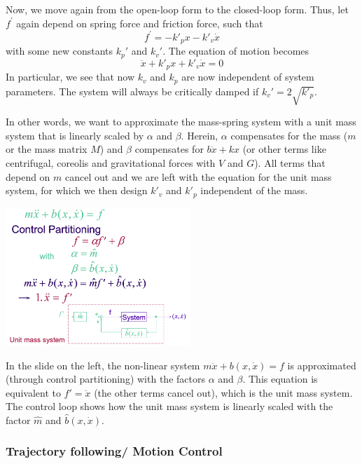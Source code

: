 Now, we move again from the open-loop form to the closed-loop form. Thus, let $f^{\prime}$ again depend on spring force and friction force, such that
$$
f^{\prime}=-k'_{p} x-k'_{v} \dot{x}
$$
with some new constants $k_{p}'$ and $k_{v}'$. The equation of motion becomes
$$
\ddot{x}+k'_{p} x+k'_{v} \dot{x}=0
$$
In particular, we see that now $k_{v}$ and $k_{p}$ are now independent of system parameters. The system will always be critically damped if $k_{v}'=2 \sqrt{k'_{p}}$.

In other words, we want to approximate the mass-spring system with a unit mass system that is linearly scaled by $\alpha$ and $\beta$. Herein, $\alpha$ compensates for the mass ($m$ or the mass matrix $M$) and $\beta$ compensates for $b\dot x+kx$ (or other terms like centrifugal, coreolis and gravitational forces with $V$ and $G$). All terms that depend on $m$ cancel out and we are left with the equation for the unit mass system, for which we then design $k'_{v}$ and $k'_{p}$ independent of the mass.
\\

\begin{minipage}[c]{0.45\textwidth}
	\includegraphics[width=7cm]{sections/imgs/7_control_partitioning.png}
\end{minipage}
\hfill
\begin{minipage}[c]{0.45\textwidth}
In the slide on the left, the non-linear system $m\ddot x+b(x,\dot x)=f$ is approximated (through control partitioning) with the factors $\alpha$ and $\beta$. This equation is equivalent to $f'=\ddot x$ (the other terms cancel out), which is the unit mass system. The control loop shows how the unit mass system is linearly scaled with the factor $\hat m$ and $\hat b(x, \dot x)$.
\end{minipage}

\subsubsection{Trajectory following/ Motion Control}

